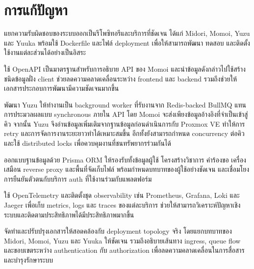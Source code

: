 \section{การแก้ปัญหา}
\begin{mycustomenum}[label=5.3.\arabic*] 
    \item แยกความรับผิดชอบของระบบออกเป็นรีโพซิทอรีและบริการที่ชัดเจน ได้แก่ Midori, Momoi, Yuzu และ Yuuka พร้อมใช้ Dockerfile และไฟล์ deployment เพื่อให้สามารถพัฒนา ทดสอบ และติดตั้งใช้งานแต่ละส่วนได้อย่างเป็นอิสระ
    \item ใช้ OpenAPI เป็นมาตรฐานสำหรับการอธิบาย API ของ Momoi และนำข้อมูลดังกล่าวไปใช้สร้างชนิดข้อมูลฝั่ง client ช่วยลดความคลาดเคลื่อนระหว่าง frontend และ backend รวมถึงช่วยให้เอกสารประกอบการพัฒนามีความชัดเจนมากขึ้น
    \item พัฒนา Yuzu ให้ทำงานเป็น background worker ที่รับงานจาก Redis-backed BullMQ แทนการประมวลผลแบบ synchronous ภายใน API โดย Momoi จะส่งเพียงข้อมูลอ้างอิงที่จำเป็นเข้าสู่คิว จากนั้น Yuzu จึงอ่านข้อมูลเพิ่มเติมจากฐานข้อมูลก่อนดำเนินการกับ Proxmox VE ทำให้การ retry และการจัดการงานระยะยาวทำได้เหมาะสมขึ้น อีกทั้งยังสามารถกำหนด concurrency ต่อคิวและใช้ distributed locks เพื่อควบคุมงานที่ชนทรัพยากรร่วมกันได้
    \item ออกแบบฐานข้อมูลด้วย Prisma ORM ให้รองรับทั้งข้อมูลผู้ใช้ โครงสร้างวิชาการ คำร้องขอ เครื่องเสมือน reverse proxy และพื้นที่จัดเก็บไฟล์ พร้อมกำหนดบทบาทของผู้ใช้อย่างชัดเจน และเชื่อมโยงการยืนยันตัวตนกับบริการ auth ที่ใช้งานร่วมกับแพลตฟอร์ม
    \item ใช้ OpenTelemetry และติดตั้งชุด observability เช่น Prometheus, Grafana, Loki และ Jaeger เพื่อเก็บ metrics, logs และ traces ของแต่ละบริการ ช่วยให้สามารถวิเคราะห์ปัญหาเชิงระบบและติดตามประสิทธิภาพได้มีประสิทธิภาพมากขึ้น
    \item จัดทำและปรับปรุงเอกสารให้สอดคล้องกับ deployment topology จริง โดยแยกบทบาทของ Midori, Momoi, Yuzu และ Yuuka ให้ชัดเจน รวมถึงอธิบายเส้นทาง ingress, queue flow และขอบเขตระหว่าง authentication กับ authorization เพื่อลดความคลาดเคลื่อนในการสื่อสารและบำรุงรักษาระบบ
\end{mycustomenum}


